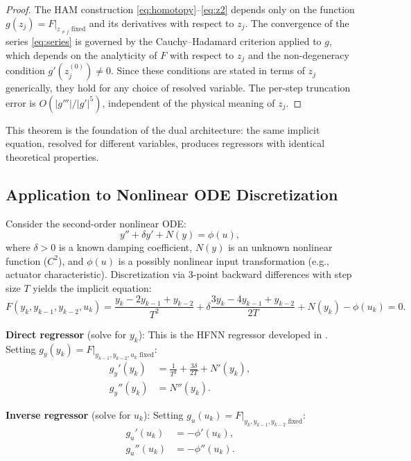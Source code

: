 \documentclass[lettersize,journal]{IEEEtran}
\begin{document}
\begin{proof}
The HAM construction \eqref{eq:homotopy}--\eqref{eq:z2} depends only on the function $g(z_j) = F|_{z_{\neq j} \text{ fixed}}$ and its derivatives with respect to $z_j$. The convergence of the series \eqref{eq:series} is governed by the Cauchy--Hadamard criterion applied to $g$, which depends on the analyticity of $F$ with respect to $z_j$ and the non-degeneracy condition $g'(z_j^{(0)}) \neq 0$. Since these conditions are stated in terms of $z_j$ generically, they hold for any choice of resolved variable. The per-step truncation error is $O(|g'''| / |g'|^5)$, independent of the physical meaning of $z_j$.
\end{proof}

This theorem is the foundation of the dual architecture: the same implicit equation, resolved for different variables, produces regressors with identical theoretical properties.

\subsection{Application to Nonlinear ODE Discretization}

Consider the second-order nonlinear ODE:
\begin{equation}
\label{eq:ode}
y'' + \delta y' + N(y) = \phi(u),
\end{equation}
where $\delta > 0$ is a known damping coefficient, $N(y)$ is an unknown nonlinear function ($C^2$), and $\phi(u)$ is a possibly nonlinear input transformation (e.g., actuator characteristic). Discretization via 3-point backward differences with step size $T$ yields the implicit equation:
\begin{equation}
\label{eq:implicit_disc}
F(y_k, y_{k-1}, y_{k-2}, u_k) = \frac{y_k - 2y_{k-1} + y_{k-2}}{T^2} + \delta \frac{3y_k - 4y_{k-1} + y_{k-2}}{2T} + N(y_k) - \phi(u_k) = 0.
\end{equation}

\textbf{Direct regressor} (solve for $y_k$): This is the HFNN regressor developed in \cite{rodrigo2025hfnn}. Setting $g_y(y_k) = F|_{y_{k-1}, y_{k-2}, u_k \text{ fixed}}$:
\begin{align}
g_y'(y_k) &= \frac{1}{T^2} + \frac{3\delta}{2T} + N'(y_k), \label{eq:gy_prime} \\
g_y''(y_k) &= N''(y_k). \label{eq:gy_double}
\end{align}

\textbf{Inverse regressor} (solve for $u_k$): Setting $g_u(u_k) = F|_{y_k, y_{k-1}, y_{k-2} \text{ fixed}}$:
\begin{align}
g_u'(u_k) &= -\phi'(u_k), \label{eq:gu_prime} \\
g_u''(u_k) &= -\phi''(u_k). \label{eq:gu_double}
\end{align}
\end{document}
